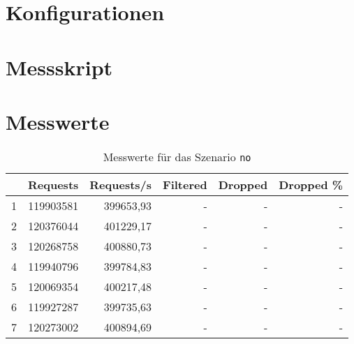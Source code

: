 
\section{Konfigurationen}
\label{sec:konfigurationen}




\clearpage


\clearpage
\section{Messskript}
\label{sec:messskript}



\clearpage
\section{Messwerte}
\label{sec:messwerte}

\begin{table}[H]
  \centering
  \bgroup
  \def\arraystretch{1.2}
  \begin{tabular}{crrrrr}
      & \textbf{Requests} & \textbf{Requests/s} & \textbf{Filtered} & \textbf{Dropped} & \textbf{Dropped \%} \\\hline\hline
      1 & 119903581 & 399653,93 & - & - & - \\\hline
      2 & 120376044 & 401229,17 & - & - & - \\\hline
      3 & 120268758 & 400880,73 & - & - & - \\\hline
      4 & 119940796 & 399784,83 & - & - & - \\\hline
      5 & 120069354 & 400217,48 & - & - & - \\\hline
      6 & 119927287 & 399735,63 & - & - & - \\\hline
      7 & 120273002 & 400894,69 & - & - & - \\\hline
  \end{tabular}
  \egroup
  \caption{Messwerte für das Szenario \texttt{no}}\label{tab:messwerte-no}
\end{table}

